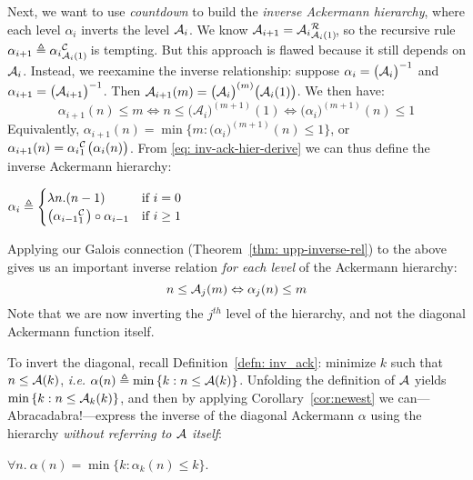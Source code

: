 Next, we want to use \emph{countdown} to build the \emph{inverse Ackermann hierarchy}, where each
level $\alpha_i$ inverts the level $\mathcal{A}_i$.
We know $\Ack_{i+1} = \rf{\Ack_i}{\Ack_i(1)}$\hspace{0.2em}, so the recursive
rule $\alpha_{i+1} \triangleq \cdt{\alpha_i}{\Ack_i(1)}$ is tempting.
But this approach is flawed because it still depends on $\mathcal{A}_i$.
Instead, we reexamine the inverse relationship: suppose $\alpha_i = \big(\mathcal{A}_i\big)^{-1}$ and $\alpha_{i+1} = \big(\mathcal{A}_{i+1}\big)^{-1}$. Then $\mathcal{A}_{i+1}(m) = \big(\mathcal{A}_{i}\big)^{(m)} \big(\mathcal{A}_{i}(1)\big)$. We then have:
\begin{equation} \label{eq: inv-ack-hier-derive}
\alpha_{i+1}(n)\le m \iff n\le \big(\mathcal{A}_i\big)^{(m+1)}(1) \iff \big(\alpha_i\big)^{(m+1)}(n) \le 1
\end{equation}
Equivalently, $\alpha_{i+1}(n) = \min\big\{m : \big( \alpha_i \big)^{(m+1)}(n)\le 1\big\}$, or $\alpha_{i+1}(n) = \cdt{\alpha_i}{1}\big(\alpha_i(n)\big)$. From \eqref{eq: inv-ack-hier-derive} we can thus define the inverse Ackermann hierarchy:
\begin{defn} \label{defn: inv-ack-hier}
	$ \alpha_i \triangleq \begin{cases}
	\lambda n.(n - 1) & \text{if } i = 0
	\\ \big(\cdt{\alpha_{i-1}}{1}\big)\circ \alpha_{i-1} & \text{if } i\ge 1 \end{cases}
$
\end{defn}

\begin{col}\label{cor:newest}
\href{https://github.com/inv-ack/inv-ack/blob/7270e64a2600b771f2b1b1b151f7d13fb2ae6c97/inv_ack.v#L43-L61}{\color{blue}\coq}
Applying our Galois connection (Theorem~\ref{thm: upp-inverse-rel}) to the above
gives us an important inverse relation \emph{for each level} of
the Ackermann hierarchy:
\begin{equation*}
n \le \mathcal{A}_j(m) \Leftrightarrow \alpha_j(n) \le m
\end{equation*}
Note that we are now inverting the $j^{th}$ level of the hierarchy,
and not the diagonal Ackermann function itself.
\end{col}

To invert the diagonal, recall Definition~\ref{defn: inv_ack}:
minimize $k$ such that $n \le \mathcal{A}(k)$, \emph{i.e.}
$\alpha(n) \triangleq \min\left\{k : n \le \mathcal{A}(k)\right\}$.
Unfolding the definition of $\mathcal{A}$ yields $\min\left\{k : n \le \mathcal{A}_k(k)\right\}$,
and then by applying Corollary~\ref{cor:newest} we can---Abracadabra!---express the inverse of the diagonal Ackermann $\alpha$ using the hierarchy \emph{without referring to $\mathcal{A}$ itself}:
\begin{thm} \label{thm: inv-ack-new}
	$\forall n.~ \alpha(n) = \min\big\{k : \alpha_k(n)\le k \big\}$.
\end{thm}


